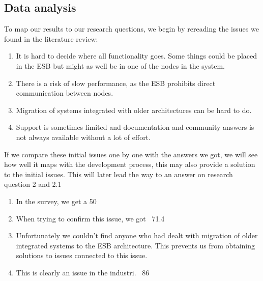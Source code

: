 \documentclass{llncs}
\begin{document}
\subsection{Data analysis}

To map our results to our research questions, we begin by rereading the issues we found in the literature review:

\begin{enumerate}
\item It is hard to decide where all functionality goes. Some things could be placed in the ESB but might as well be in one of the nodes in the system.
\item There is a risk of slow performance, as the ESB prohibits direct communication between nodes.
\item Migration of systems integrated with older architectures can be hard to do.
\item Support is sometimes limited and documentation and community answers is not always available without a lot of effort.
\end{enumerate}

If we compare these initial issues one by one with the answers we got, we will see how well it maps with the development process, this may also provide a solution to the initial issues. This will later lead the way to an answer on research question 2 and 2.1

\begin{enumerate}
\item In the survey, we get a 50%
\item When trying to confirm this issue, we got ~71.4%
\item Unfortunately we couldn’t find anyone who had dealt with migration of older integrated systems to the ESB architecture. This prevents us from obtaining solutions to issues connected to this issue.
\item This is clearly an issue in the industri. ~86%
\end{enumerate}
\end{document}
